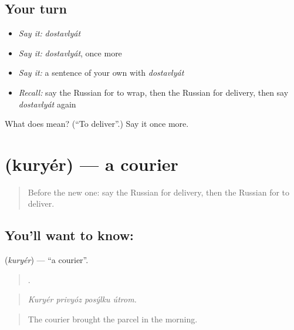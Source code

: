 \subsection*{Your turn}
\begin{itemize}
\raggedright
  \item \emph{Say it:} \emph{dostavlyát}
  \item \emph{Say it:} \emph{dostavlyát}, once more
  \item \emph{Say it:} a sentence of your own with \emph{dostavlyát}
  \item \emph{Recall:} say the Russian for to wrap, then the Russian for delivery, then say \emph{dostavlyát} again
\end{itemize}

\begin{tcolorbox}[breakable,colback=teal!4,colframe=teal!35!black,title={Before you move on}]
What does  mean? (\textquotedblleft{}To deliver\textquotedblright{}.) Say it once more.
\end{tcolorbox}
\section[\texorpdfstring{\ru{курьер} (kuryér)}{курьер (kuryér)}]{ (kuryér) — a courier}

\label{lesson:RU-C457-kuryer}



\begin{quote}
Before the new one: say the Russian for delivery, then the Russian for to deliver.
\end{quote}

\subsection*{You'll want to know: }
\textbf{} (\emph{kuryér}) — \textquotedblleft{}a courier\textquotedblright{}.

\begin{quote}
   .
\end{quote}

\begin{quote}
\emph{Kuryér privyóz posýlku útrom.}
\end{quote}

\begin{quote}
The courier brought the parcel in the morning.
\end{quote}

